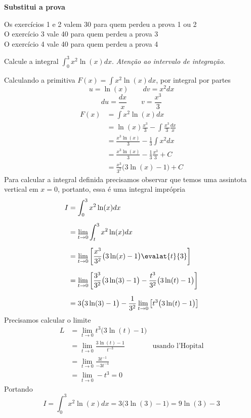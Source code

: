 \documentclass[a4paper,12pt,fleqn]{article}
\begin{document}

\vspace{\baselineskip}
\textbf{Substitui a prova} \underline{\hspace{20mm}}
\vspace{\baselineskip}

Os exercícios 1 e 2 valem 30 para quem perdeu a prova 1 ou 2 \\[-1mm]
O exercício 3 vale 40 para quem perdeu a prova 3 \\[-1mm]
O exercício 4 vale 40 para quem perdeu a prova 4

\vspace{\baselineskip}
Calcule a integral \(\int_0^3 x^2\ln(x) dx\).
\textit{Atenção ao intervalo de integração}.

\begin{answer}
  Calculando a primitiva
  \(
    F(x) = \int x^2\ln(x) dx
  \),
  por integral por partes
  \[
    u = \ln(x)
    \qquad
    dv = x^2dx
  \]
  \[
    du = \frac{dx}{x}
    \qquad
    v = \frac{x^3}{3}
  \]
  \begin{align*}
    F(x)
    & = \int x^2\ln(x) dx \\[2mm]
    & = \ln(x)\frac{x^3}{3} - \int \frac{x^3}{3} \frac{dx}{x} \\[2mm]
    & = \frac{x^3\ln(x)}{3} - \frac{1}{3}\int x^2 dx\\[2mm]
    & = \frac{x^3\ln(x)}{3} - \frac{1}{3} \frac{x^3}{3} + C\\[2mm]
    & = \frac{x^3}{3^2}\big(3\ln(x)-1\big) + C
  \end{align*}
  Para calcular a integral definida precisamos observar que temos uma assintota
  vertical em $x=0$, portanto, essa é uma integral imprópria
  \begin{align*}
    I
    & = \int_0^3 x^2\ln(x) dx \\[2mm]
    & = \lim_{t\to0} \int_t^3 x^2\ln(x) dx \\[2mm]
    & = \lim_{t\to0} \left[\frac{x^3}{3^2}\big(3\ln(x)-1\big)\evalat{t}{3}\right]  \\[2mm]
    & = \lim_{t\to0} \left[\frac{3^3}{3^2}\big(3\ln(3)-1\big)
                         - \frac{t^3}{3^2}\big(3\ln(t)-1\big)\right]   \\[2mm]
    & = 3\big(3\ln(3)-1\big)
      - \frac{1}{3^2}\lim_{t\to0} \left[t^3\big(3\ln(t)-1\big)\right]
  \end{align*}
  Precisamos calcular o limite
  \begin{align*}
    L
    & = \lim_{t\to0} t^3\big(3\ln(t)-1\big)  \\[2mm]
    & = \lim_{t\to0} \frac{3\ln(t)-1}{t^{-3}} & \text{usando l'Hopital}\\[2mm]
    & = \lim_{t\to0} \frac{3t^{-1}}{-3t^{-4}} \\[2mm]
    & = \lim_{t\to0} -t^3 = 0
  \end{align*}
  Portando
  \[
    I = \int_0^3 x^2\ln(x) dx
    = 3\big(3\ln(3)-1\big)
    = 9\ln(3)-3
  \]
\end{answer}
\end{document}
